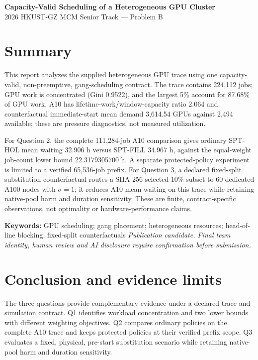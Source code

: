 
\usepackage{lastpage}

\begin{titlepage}
\thispagestyle{fancy}
\begin{center}
\vspace*{0.35in}
{\LARGE\bfseries\color{primary} Capacity-Valid Scheduling of a Heterogeneous GPU Cluster}\\[8pt]
{\large 2026 HKUST-GZ MCM Senior Track --- Problem B}\\[18pt]
\end{center}
\section*{Summary}
This report analyzes the supplied heterogeneous GPU trace using one capacity-valid, non-preemptive, gang-scheduling contract. The trace contains 224,112 jobs; GPU work is concentrated (Gini 0.9522), and the largest 5\% account for 87.68\% of GPU work. A10 has lifetime-work/window-capacity ratio 2.064 and counterfactual immediate-start mean demand 3,614.54 GPUs against 2,494 available; these are pressure diagnostics, not measured utilization.

For Question 2, the complete 111,284-job A10 comparison gives ordinary SPT-HOL mean waiting 32.906 h versus SPT-FILL 34.967 h, against the equal-weight job-count lower bound 22.3179305700 h. A separate protected-policy experiment is limited to a verified 65,536-job prefix. For Question 3, a declared fixed-split substitution counterfactual routes a SHA-256-selected 10\% subset to 60 dedicated A100 nodes with $\sigma=1$; it reduces A10 mean waiting on this trace while retaining native-pool harm and duration sensitivity. These are finite, contract-specific observations, not optimality or hardware-performance claims.

\textbf{Keywords:} GPU scheduling; gang placement; heterogeneous resources; head-of-line blocking; fixed-split counterfactuals
\vfill
\textit{Publication candidate. Final team identity, human review and AI disclosure require confirmation before submission.}
\end{titlepage}
\setcounter{page}{2}



\section{Conclusion and evidence limits}
The three questions provide complementary evidence under a declared trace and simulation contract. Q1 identifies workload concentration and two lower bounds with different weighting objectives. Q2 compares ordinary policies on the complete A10 trace and keeps protected policies at their verified prefix scope. Q3 evaluates a fixed, physical, pre-start substitution scenario while retaining native-pool harm and duration sensitivity.

